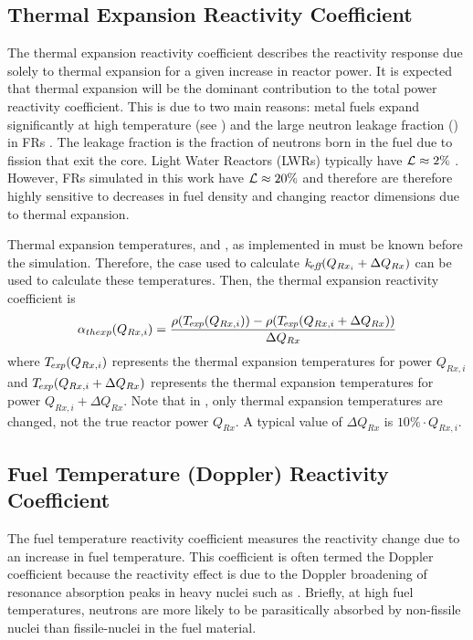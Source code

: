   \subsection{Thermal Expansion Reactivity Coefficient}
  \label{sec:thermal_expansion_reactivity_coefficent}
    The thermal expansion reactivity coefficient describes the reactivity 
    response due solely to thermal expansion for a given increase in reactor 
    power. It is expected that thermal expansion will be the dominant 
    contribution to the total power reactivity coefficient. This is due to two 
    main reasons: metal fuels expand significantly at high temperature (see 
    ) and the large neutron leakage fraction 
    (\leakage) in FRs \cite{PlentifulEnergy}. The leakage fraction is the 
    fraction of neutrons born in the fuel due to fission that exit the core. 
    Light Water Reactors (LWRs) typically have $\mathcal{L} \approx 2 \%$ 
    \cite{textbookknief}. However, FRs simulated in this work have 
    $\mathcal{L} \approx 20\%$ and therefore are therefore highly sensitive to 
    decreases in fuel density and changing reactor dimensions due to thermal 
    expansion.

    Thermal expansion temperatures, \texpfuel and \texpstruct, as implemented in 
     must be known before the simulation. Therefore,
    the case used to calculate $k_{\!\mbox{\scriptsize \em eff}}(Q_{Rx_i} + \Delta Q_{Rx})$ can be used to
    calculate these temperatures. Then, the thermal expansion reactivity
    coefficient is 
    \begin{equation}
      \label{eq:thermal_expansion_reactivity_coefficient}
      \alpha_{thexp}(Q_{Rx,i}) = \frac{\rho({T_{\!\mbox{\scriptsize \em exp}}}(Q_{Rx,i})) - 
        \rho({T_{\!\mbox{\scriptsize \em exp}}}(Q_{Rx,i} + \Delta Q_{Rx}))}
        {\Delta Q_{Rx}}
    \end{equation}
    where ${T_{\!\mbox{\scriptsize \em exp}}}(Q_{Rx,i})$ represents the thermal expansion temperatures for
    power $Q_{Rx,i}$ and ${T_{\!\mbox{\scriptsize \em exp}}}(Q_{Rx,i} + \Delta Q_{Rx})$ represents the
    thermal expansion temperatures for power $Q_{Rx,i} + \Delta Q_{Rx}$. Note
    that in , only thermal
    expansion temperatures are changed, not the true reactor power $Q_{Rx}$.
    A typical value of $\Delta Q_{Rx}$ is $10\% \cdot Q_{Rx,i}$.

  \subsection{Fuel Temperature (Doppler) Reactivity Coefficient}
  \label{sec:fuel_temperature_reactivity_coefficient}
    The fuel temperature reactivity coefficient measures the reactivity change 
    due to an increase in fuel temperature. This coefficient is often termed the
    Doppler coefficient because the reactivity effect is due to the Doppler
    broadening of resonance absorption peaks in heavy nuclei such as
     \cite{textbookknief}. Briefly, at high fuel temperatures, 
    neutrons are more likely to be parasitically absorbed by non-fissile nuclei
    than fissile-nuclei in the fuel material.

